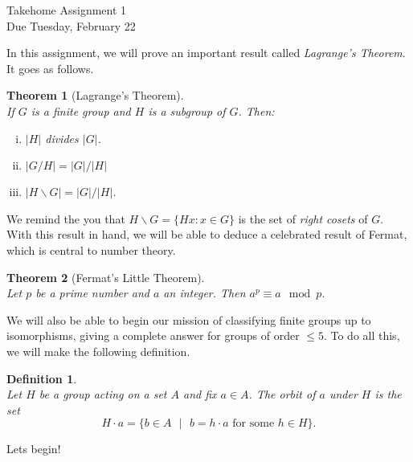 \documentclass[11pt]{article}
\newtheorem{theorem}{Theorem}
\newtheorem{definition}{Definition}
\begin{document}
\begin{center}
\Large {Takehome Assignment 1}\\
\small {Due Tuesday, February 22}
\end{center}
In this assignment, we will prove an important result called \textit{Lagrange's Theorem}.  It goes as follows.
\begin{theorem}[Lagrange's Theorem]~\\
  If $G$ is a finite group and $H$ is a subgroup of $G$.  Then:
  \begin{enumerate}[(i)]
     \item $|H|$ divides $|G|$.
     \item $|G/H| = |G|/|H|$
     \item $|H\backslash G| = |G|/|H|$.
  \end{enumerate}
\end{theorem}
We remind the you that $H\backslash G = \{Hx:x\in G\}$ is the set of \textit{right cosets} of $G$.  With this result in hand, we will be able to deduce a celebrated result of Fermat, which is central to number theory.
\begin{theorem}[Fermat's Little Theorem]~\\
  Let $p$ be a prime number and $a$ an integer.  Then $a^p\equiv a\mod p$.
\end{theorem}
We will also be able to begin our mission of classifying finite groups up to isomorphisms, giving a complete answer for groups of order $\le5$.  To do all this, we will make the following definition.
\begin{definition}~\\
  Let $H$ be a group acting on a set $A$ and fix $a\in A$.  The \textit{orbit} of $a$ under $H$ is the set
  \[H\cdot a = \{b\in A\text{ }|\text{ }b=h\cdot a\text{ for some }h\in H\}.\]
\end{definition}
Lets begin!
\end{document}
